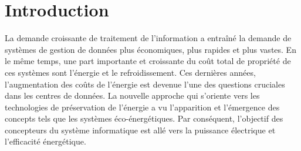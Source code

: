 \section{Introduction}
La demande croissante de traitement de l'information a entraîné la demande de systèmes de gestion de données plus économiques, plus rapides et plus vastes. En le même temps, une part importante et croissante du coût total de propriété de ces systèmes sont l'énergie et le refroidissement. Ces dernières années, l'augmentation des coûts de l'énergie est devenue l'une des questions cruciales dans les centres de données. La nouvelle approche qui s'oriente vers les technologies de préservation de l'énergie a vu l'apparition et l'émergence des concepts tels que les systèmes éco-énergétiques. Par conséquent, l'objectif des concepteurs du système informatique est allé vers la puissance électrique et l'efficacité énergétique. 

